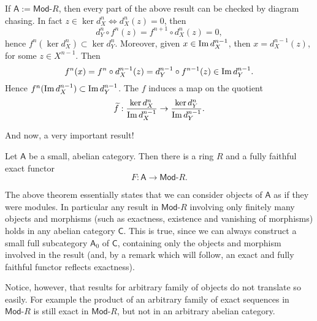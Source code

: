 \begin{rem}[]
	If $\mathsf{A} := \mathsf{Mod}\text{-}R$, then every part of the above result can be
	checked by diagram chasing.
	In fact $z \in \ker d^n_X \iff d^n_X(z) = 0$, then
	\begin{equation}
		d^n_Y \circ f^n(z) = f^{n+1} \circ d^n_X(z) = 0
	,\end{equation} 
	hence $f^n(\ker d^n_X) \subset \ker d^n_Y$.
	Moreover, given $x \in \operatorname{Im} d^{n-1}_X$, then $x = d^{n-1}_X(z)$, for some $z \in X^{n-1}$.
	Then
	\begin{equation}
		f^n(x) = f^n \circ d^{n-1}_X(z) =
		d^{n-1}_Y \circ f^{n-1} (z) \in \operatorname{Im} d^{n-1}_Y
	.\end{equation} 
	Hence $f^n(\operatorname{Im} d^{n-1}_X) \subset \operatorname{Im} d^{n-1}_Y$.
	The $f$ induces a map on the quotient
	\begin{equation}
	\widetilde{f}: \frac{\ker d^n_X}{\operatorname{Im} d_X^{n-1}} \to \frac{\ker d^n_Y}{\operatorname{Im} d_Y^{n-1}}
	.\end{equation} 
\end{rem}

And now, a very important result!
\begin{thm}
	Let $\mathsf{A}$ be a small, abelian category.
	Then there is a ring $R$ and a fully faithful exact functor
	\begin{equation}
	F: \mathsf{A} \to \mathsf{Mod}\text{-}R
	.\end{equation} 
\end{thm}

\begin{rem}[]
	The above theorem essentially states that we can consider objects of $\mathsf{A}$ as if they were modules.
	In particular any result in $\mathsf{Mod}\text{-}R$ involving only finitely many
	objects and morphisms (such as exactness, existence and vanishing of morphisms)
	holds in any abelian category $\mathsf{C}$.
	This is true, since we can always construct a small full subcategory $\mathsf{A}_0$ of $\mathsf{C}$,
	containing only the objects and morphism involved in the result (and, by a remark which will follow,
	an exact and fully faithful functor reflects exactness).

	Notice, however, that results for arbitrary family of objects do not translate so easily.
	For example the product of an arbitrary family of exact sequences in $\mathsf{Mod}\text{-}R$
	is still exact in $\mathsf{Mod}\text{-}R$, 
	but not in an arbitrary abelian category.
\end{rem}

